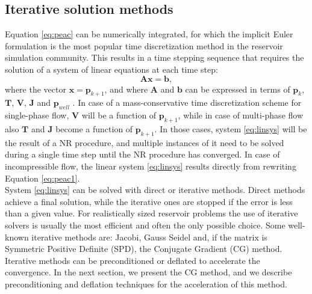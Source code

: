 \documentclass{ecmorXV}
\begin{document}
\subsection{Iterative solution methods}\label{syseq}
\hspace{0.5cm}Equation \eqref{eq:peac} can be numerically integrated, for which 
the implicit Euler formulation is the most popular time discretization method in the 
reservoir simulation community. This results in a time stepping sequence that 
requires the solution of a system of linear equations at each time step: 
\begin{equation}\label{eq:linsys}
 \mathbf{A}\mathbf{x}=\mathbf{b},
\end{equation}
where the vector $\mathbf{x} = \mathbf{p}_{k+1}$, and where $\mathbf{A}$ and $\mathbf{b}$ can be expressed in 
terms of $\mathbf{p}_k$, $\mathbf{T}$, $\mathbf{V}$, $\mathbf{J}$ and $\mathbf{p}_{well}$ \cite{Jansen13}. 
In case of a mass-conservative time discretization scheme for single-phase flow, $\mathbf{V}$ will be a 
function of $\mathbf{p}_{k+1}$, 
while in case of multi-phase flow also $\mathbf{T}$ and $\mathbf{J}$ become a function of $\mathbf{p}_{k+1}$. 
In those cases, system \eqref{eq:linsys} will be the result 
of a NR procedure, and multiple instances of it need to be solved during a single time step until the 
NR procedure has converged. In case of incompressible flow, the linear
system \eqref{eq:linsys} results directly from rewriting Equation \eqref{eq:peac1}. \\
System \eqref{eq:linsys} can be solved with direct or iterative methods.
Direct methods achieve a final solution, while the iterative ones
are stopped if the error is less than a given value. For realistically sized reservoir problems the use of iterative solvers is usually the most efficient 
and often the only possible choice. Some well-known iterative methods are: Jacobi, Gauss Seidel and, 
if the matrix is Symmetric Positive Definite (SPD), the Conjugate Gradient (CG) method.
Iterative methods can be preconditioned or deflated to accelerate the convergence. In the next section, 
we present the CG method, and we describe preconditioning and deflation techniques for the acceleration 
of this method.
\end{document}
